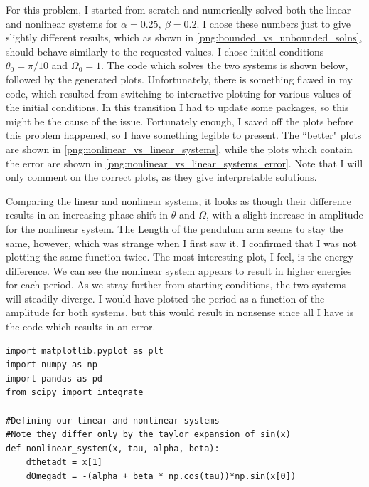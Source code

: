 \documentclass[12pt]{article}
\newcommand{\jump}{\vspace{5mm}}
\begin{document}
\begin{enumerate}[]
\begin{enumerate}[(b)]
\jump
\begin{solution}

    For this problem, I started from scratch and numerically solved both the linear and nonlinear systems for $\alpha = 0.25, \ \beta = 0.2$. I chose these numbers just to give slightly different results, which as shown in \ref{png:bounded_vs_unbounded_solns}, should behave similarly to the requested values. I chose initial conditions $\theta_0 = \pi/10$ and $\Omega_0 = 1$. The code which solves the two systems is shown below, followed by the generated plots. Unfortunately, there is something flawed in my code, which resulted from switching to interactive plotting for various values of the initial conditions. In this transition I had to update some packages, so this might be the cause of the issue. Fortunately enough, I saved off the plots before this problem happened, so I have something legible to present. The ``better" plots are shown in \ref{png:nonlinear_vs_linear_systems}, while the plots which contain the error are shown in \ref{png:nonlinear_vs_linear_systems_error}. Note that I will only comment on the correct plots, as they give interpretable solutions. 

    \jump
    Comparing the linear and nonlinear systems, it looks as though their difference results in an increasing phase shift in $\theta$ and $\Omega$, with a slight increase in amplitude for the nonlinear system. The Length of the pendulum arm seems to stay the same, however, which was strange when I first saw it. I confirmed that I was not plotting the same function twice. The most interesting plot, I feel, is the energy difference. We can see the nonlinear system appears to result in higher energies for each period. As we stray further from starting conditions, the two systems will steadily diverge. I would have plotted the period as a function of the amplitude for both systems, but this would result in nonsense since all I have is the code which results in an error.

\jump
\end{solution}

\begin{lstlisting}
import matplotlib.pyplot as plt
import numpy as np
import pandas as pd
from scipy import integrate

#Defining our linear and nonlinear systems
#Note they differ only by the taylor expansion of sin(x)
def nonlinear_system(x, tau, alpha, beta):
    dthetadt = x[1]
    dOmegadt = -(alpha + beta * np.cos(tau))*np.sin(x[0])
    

\end{lstlisting}
\end{enumerate}
\end{enumerate}
\end{document}
